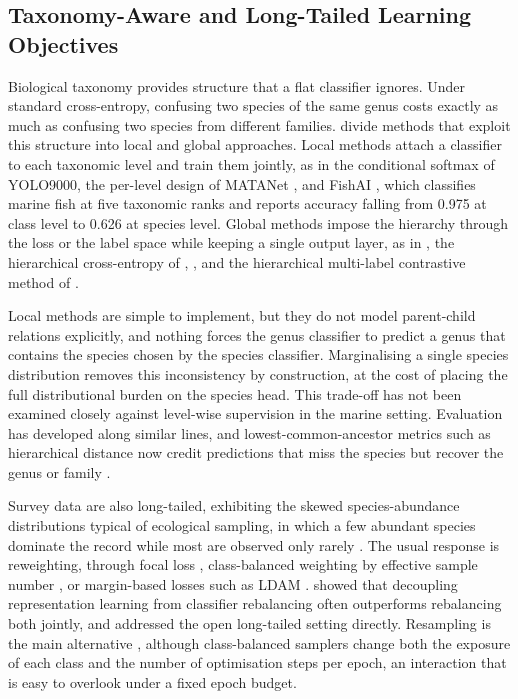 \documentclass[preprint,12pt]{elsarticle}
\begin{document}
\subsection{Taxonomy-Aware and Long-Tailed Learning
Objectives}\label{taxonomy-aware-and-long-tailed-learning-objectives}

Biological taxonomy provides structure that a flat classifier ignores.
Under standard cross-entropy, confusing two species of the same genus
costs exactly as much as confusing two species from different families.
\citet{ref23} divide methods
that exploit this structure into local and global approaches. Local
methods attach a classifier to each taxonomic level and train them
jointly, as in the conditional softmax of
YOLO9000\citep{ref59}, the per-level design of
MATANet \citep{ref26}, and FishAI
\citep{ref60} , which classifies marine fish at
five taxonomic ranks and reports accuracy falling from 0.975 at class
level to 0.626 at species level. Global methods impose the hierarchy
through the loss or the label space while keeping a single output layer,
as in \citet{ref61}, the hierarchical
cross-entropy of \citet{ref24},
\citet{ref32}, and the hierarchical
multi-label contrastive method of \citet{ref62}.

Local methods are simple to implement, but they do not model
parent-child relations explicitly, and nothing forces the genus
classifier to predict a genus that contains the species chosen by the
species classifier\citep{ref23}. Marginalising a
single species distribution removes this inconsistency by construction,
at the cost of placing the full distributional burden on the species
head. This trade-off has not been examined closely against level-wise
supervision in the marine setting. Evaluation has developed along
similar lines, and lowest-common-ancestor metrics such as hierarchical
distance now credit predictions that miss the species but recover the
genus or family \citep{ref24,ref30,ref61}.

Survey data are also long-tailed, exhibiting the skewed
species-abundance distributions typical of ecological sampling, in which
a few abundant species dominate the record while most are observed only
rarely \citep{ref12,ref15}. The usual response is reweighting,
through focal loss \citep{ref63}, class-balanced
weighting by effective sample number
\citep{ref14}, or margin-based losses such as
LDAM \citep{ref64}. \citet{ref65} showed that decoupling
representation learning from classifier rebalancing often outperforms
rebalancing both jointly, and \citet{ref16} addressed the open long-tailed
setting directly. Resampling is the main alternative
\citep{ref15}, although class-balanced samplers
change both the exposure of each class and the number of optimisation
steps per epoch, an interaction that is easy to overlook under a fixed
epoch budget.
\end{document}
